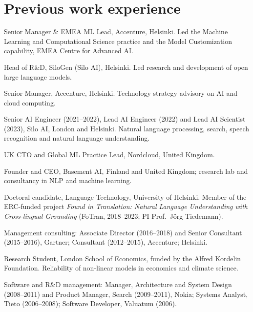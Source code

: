 \documentclass[12pt,a4paper]{article}
\newenvironment{entries}{%
  \begin{list}{}{%
    \setlength{\labelwidth}{2.7cm}%
    \setlength{\labelsep}{0.3cm}%
    \setlength{\leftmargin}{3.0cm}%
    \setlength{\itemsep}{2pt}%
    \setlength{\parsep}{0pt}%
    \setlength{\topsep}{1pt}%
    \renewcommand{\makelabel}[1]{##1\hfil}}}%
  {\end{list}}
\begin{document}
\section{Previous work experience}
\begin{entries}
  \item[2024--2025] Senior Manager \& EMEA ML Lead, Accenture, Helsinki. Led the Machine Learning and Computational Science practice and the Model Customization capability, EMEA Centre for Advanced AI.
  \item[2023--2024] Head of R\&D, SiloGen (Silo AI), Helsinki. Led research and development of open large language models.
  \item[2023] Senior Manager, Accenture, Helsinki. Technology strategy advisory on AI and cloud computing.
  \item[2021--2023] Senior AI Engineer (2021--2022), Lead AI Engineer (2022) and Lead AI Scientist (2023), Silo AI, London and Helsinki. Natural language processing, search, speech recognition and natural language understanding.
  \item[2020--2021] UK CTO and Global ML Practice Lead, Nordcloud, United Kingdom.
  \item[2019--2020] Founder and CEO, Basement AI, Finland and United Kingdom; research lab and consultancy in NLP and machine learning.
  \item[2018--2024] Doctoral candidate, Language Technology, University of Helsinki. Member of the ERC-funded project \emph{Found in Translation: Natural Language Understanding with Cross-lingual Grounding} (FoTran, 2018--2023; PI Prof.\ Jörg Tiedemann).
  \item[2012--2018] Management consulting: Associate Director (2016--2018) and Senior Consultant (2015--2016), Gartner; Consultant (2012--2015), Accenture; Helsinki.
  \item[2011--2012] Research Student, London School of Economics, funded by the Alfred Kordelin Foundation. Reliability of non-linear models in economics and climate science.
  \item[2006--2011] Software and R\&D management: Manager, Architecture and System Design (2008--2011) and Product Manager, Search (2009--2011), Nokia; Systems Analyst, Tieto (2006--2008); Software Developer, Valuatum (2006).
\end{entries}
\end{document}
